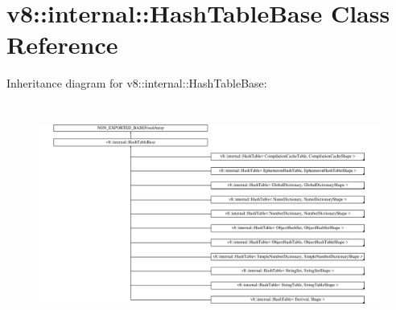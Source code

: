 \hypertarget{classv8_1_1internal_1_1HashTableBase}{}\section{v8\+:\+:internal\+:\+:Hash\+Table\+Base Class Reference}
\label{classv8_1_1internal_1_1HashTableBase}
Inheritance diagram for v8\+:\+:internal\+:\+:Hash\+Table\+Base\+:\begin{figure}[H]
\begin{center}
\leavevmode
\includegraphics[height=7.353536cm]{classv8_1_1internal_1_1HashTableBase}
\end{center}
\end{figure}
